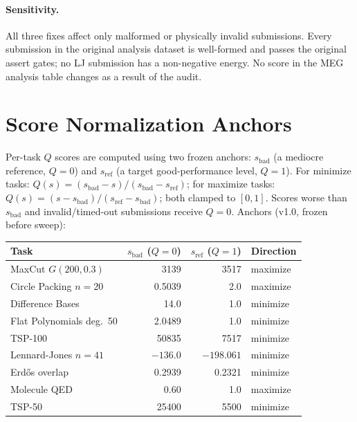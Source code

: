 \documentclass{article}
\begin{document}
\paragraph{Sensitivity.}
All three fixes affect only malformed or physically invalid submissions. Every submission in the original analysis dataset is well-formed and passes the original assert gates; no LJ submission has a non-negative energy. No score in the MEG analysis table changes as a result of the audit.

\section{Score Normalization Anchors}
\label{app:normalization}

Per-task $Q$ scores are computed using two frozen anchors: $s_\mathrm{bad}$ (a mediocre reference, $Q{=}0$) and $s_\mathrm{ref}$ (a target good-performance level, $Q{=}1$). For minimize tasks: $Q(s) = (s_\mathrm{bad} - s)/(s_\mathrm{bad} - s_\mathrm{ref})$; for maximize tasks: $Q(s) = (s - s_\mathrm{bad})/(s_\mathrm{ref} - s_\mathrm{bad})$; both clamped to $[0,1]$. Scores worse than $s_\mathrm{bad}$ and invalid/timed-out submissions receive $Q{=}0$. Anchors (v1.0, frozen before sweep):

\begin{center}
\small
\begin{tabular}{lrrl}
\toprule
Task & $s_\mathrm{bad}$ ($Q{=}0$) & $s_\mathrm{ref}$ ($Q{=}1$) & Direction \\
\midrule
MaxCut $G(200,0.3)$      & 3139     & 3517        & maximize \\
Circle Packing $n{=}20$  & 0.5039   & 2.0         & maximize \\
Difference Bases         & 14.0     & 1.0         & minimize \\
Flat Polynomials deg.~50 & 2.0489   & 1.0         & minimize \\
TSP-100                  & 50835    & 7517        & minimize \\
Lennard-Jones $n{=}41$   & $-136.0$ & $-198.061$  & minimize \\
Erd\H{o}s overlap        & 0.2939   & 0.2321      & minimize \\
Molecule QED             & 0.60     & 1.0         & maximize \\
TSP-50                   & 25400    & 5500        & minimize \\
\bottomrule
\end{tabular}
\end{center}
\end{document}
